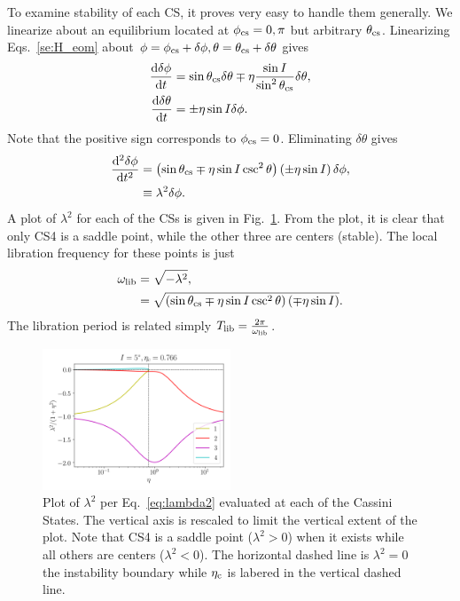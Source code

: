 \documentclass[
        fleqn,
        usenatbib,
    ]{mnras}
\newcommand*{\rd}[2]{\frac{\mathrm{d}#1}{\mathrm{d}#2}}
\newcommand*{\rtd}[2]{\frac{\mathrm{d}^2#1}{\mathrm{d}#2^2}}
\newcommand*{\p}[1]{\left(#1\right)}
\begin{document}
To examine stability of each CS, it proves very easy to handle them generally.
We linearize about an equilibrium located at $\phi_{\rm cs} = 0, \pi$ but
arbitrary $\theta_{\rm cs}$. Linearizing Eqs.~\eqref{se:H_eom} about $\phi =
\phi_{\rm cs} + \delta \phi, \theta = \theta_{\rm cs} + \delta \theta$ gives
\begin{subequations}\label{se:H_eom_lin}
    \begin{align}
        \rd{\delta \phi}{t} &= \sin \theta_{\rm cs} \delta \theta
            \mp \eta \frac{\sin I}{\sin^2\theta_{\rm cs}} \delta \theta,\\
        \rd{\delta \theta}{t} &= \pm \eta \sin I \delta \phi.
    \end{align}
\end{subequations}
Note that the positive sign corresponds to $\phi_{\rm cs} = 0$. Eliminating
$\delta \theta$ gives
\begin{align}
    \rtd{\delta \phi}{t} &= \p{\sin \theta_{\rm cs}
        \mp \eta \sin I\csc^2\theta}\p{\pm \eta \sin I} \delta
            \phi,\\
        &\equiv \lambda^2\delta \phi.\label{eq:lambda2}
\end{align}
A plot of $\lambda^2$ for each of the CSs is given in Fig.~\ref{fig:lambda2}.
From the plot, it is clear that only CS4 is a saddle point, while the other
three are centers (stable). The local libration frequency for these points is
just
\begin{align}
    \omega_{\rm lib} &= \sqrt{-\lambda^2},\\
        &= \sqrt{\p{\sin \theta_{\rm cs}
            \mp \eta \sin I \csc^2\theta}\p{\mp \eta \sin I}}.
\end{align}
The libration period is related simply $T_{\rm lib} = \frac{2\pi}{\omega_{\rm
lib}}$.
\begin{figure}
    \centering
    \includegraphics[width=0.5\textwidth]{plots_diskdisp/2_lambdas.png}
    \caption{Plot of $\lambda^2$ per Eq.~\eqref{eq:lambda2} evaluated at each
    of the Cassini States. The vertical axis is rescaled to limit the vertical
    extent of the plot. Note that CS4 is a saddle point ($\lambda^2 > 0$) when
    it exists while all others are centers ($\lambda^2 < 0$). The horizontal
    dashed line is $\lambda^2 = 0$ the instability boundary while $\eta_{\rm c}$ is
    labered in the vertical dashed line.}\label{fig:lambda2}
\end{figure}
\end{document}
